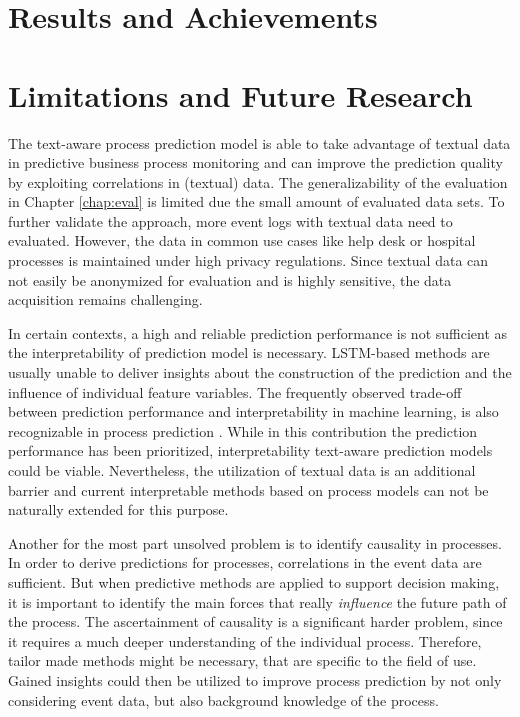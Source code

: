
\section{Results and Achievements}

\section{Limitations and Future Research}

The text-aware process prediction model is able to take advantage of textual data in predictive business process monitoring and can improve the prediction quality by exploiting correlations in (textual) data.
The generalizability of the evaluation in Chapter \ref{chap:eval} is limited due the small amount of evaluated data sets.
To further validate the approach, more event logs with textual data need to evaluated.
However, the data in common use cases like help desk or hospital processes is maintained under high privacy regulations.
Since textual data can not easily be anonymized for evaluation and is highly sensitive, the data acquisition remains challenging.

In certain contexts, a high and reliable prediction performance is not sufficient as the interpretability of prediction model is necessary.
LSTM-based methods are usually unable to deliver insights about the construction of the prediction and the influence of individual feature variables.
The frequently observed trade-off between prediction performance and interpretability in machine learning, is also recognizable in process prediction \cite{DBLP:journals/corr/abs-1811-00062}.
While in this contribution the prediction performance has been prioritized, interpretability text-aware prediction models could be viable.
Nevertheless, the utilization of textual data is an additional barrier and current interpretable methods based on process models can not be naturally extended for this purpose.

Another for the most part unsolved problem is to identify causality in processes.
In order to derive predictions for processes, correlations in the event data are sufficient.
But when predictive methods are applied to support decision making, it is important to identify the main forces that really \textit{influence} the future path of the process.
The ascertainment of causality is a significant harder problem, since it requires a much deeper understanding of the individual process.
Therefore, tailor made methods might be necessary, that are specific to the field of use.
Gained insights could then be utilized to improve process prediction by not only considering event data, but also background knowledge of the process.
